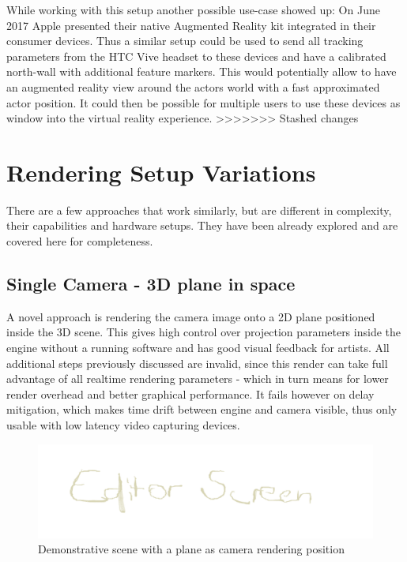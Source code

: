While working with this setup another possible use-case showed up: On June 2017 
Apple presented their native Augmented Reality kit integrated in their consumer 
devices. Thus a similar setup could be used to send all tracking parameters 
from the HTC Vive headset to these devices and have a calibrated north-wall 
with additional feature markers. This would potentially allow to have an 
augmented reality view around the actors world with a fast approximated actor 
position. It could then be possible for multiple users to use these devices as 
window into the virtual reality experience.
>>>>>>> Stashed changes

\section{Rendering Setup Variations}

There are a few approaches that work similarly, but are different in 
complexity, their capabilities and hardware setups. They have been already 
explored and are covered here for completeness.

\subsection{Single Camera - 3D plane in space}

A novel approach is rendering the camera image onto a 2D plane positioned 
inside the 3D scene. This gives high control over projection parameters inside 
the engine without a running software and has good visual feedback for artists. 
All additional steps previously discussed are invalid, since this render can 
take full advantage of all realtime rendering parameters - which in turn means 
for lower render overhead and better graphical performance. It fails however on 
delay mitigation, which makes time drift between engine and camera visible, 
thus only usable with low latency video capturing devices.

\begin{figure}[htb]
	\includegraphics[width=\textwidth]{_raw_resources/editor_single_camera.png}
	\caption{Demonstrative scene with a plane as camera rendering position}
	\label{fig:alt-render:single-camera}
\end{figure}

